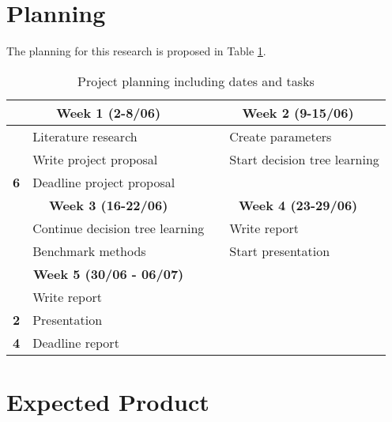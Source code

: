 \documentclass[a4paper,8pt]{article}
\begin{document}
\section*{Planning}
The planning for this research is proposed in Table \ref{table:planning}.

\begin{table}[H]
\small
\caption{Project planning including dates and tasks}
\label{table:planning}
\begin{tabular}{|l l|l l|}

\hline
\multicolumn{2}{|c|}{\textbf{Week 1 (2-8/06)}} & \multicolumn{2}{|c|}{\textbf{Week 2 (9-15/06)}}\\
\hline
& Literature research & & Create parameters  \\
& Write project proposal & & Start decision tree learning \\

\textbf{6} & Deadline project proposal &  \multicolumn{2}{|c|}{~} \\ 
\hline
\multicolumn{2}{|c|}{\textbf{Week 3 (16-22/06)}} & \multicolumn{2}{|c|}{\textbf{Week 4 (23-29/06)}}\\
\hline
& Continue decision tree learning & & Write report\\
& Benchmark methods & & Start presentation\\
\hline
\multicolumn{2}{|c|}{\textbf{Week 5 (30/06 - 06/07)}} & & \\
\hline
&Write report &  \multicolumn{2}{|c|}{~} \\
\textbf{2} & Presentation &   \multicolumn{2}{|c|}{~}\\
\textbf{4} & Deadline report &  \multicolumn{2}{|c|}{~} \\
\hline

\hline
\end{tabular}
\end{table}

\section*{Expected Product}



\pagebreak

{}

\end{document}
